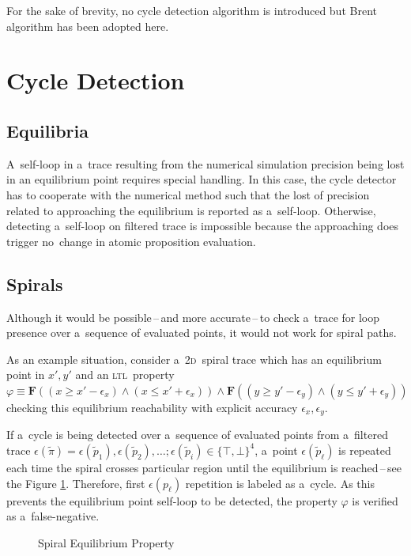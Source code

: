 \documentclass[12pt,twoside,draft]{fithesis}
\newcommand{\ltl}{\textsc{ltl}~}
\newcommand{\bF}{\mathbf{F}}
\begin{document}
For the sake of brevity, no cycle detection algorithm is introduced
but Brent algorithm\cite{wloop,brent} has been adopted here.

\section{Cycle Detection}
\subsection*{Equilibria}
A~self-loop in a~trace resulting from the numerical simulation precision
being lost in an equilibrium point requires special handling. In this
case, the cycle detector has to cooperate with the numerical method such
that the lost of precision related to approaching the equilibrium is
reported as a~self-loop. Otherwise, detecting a~self-loop on filtered
trace is impossible because the approaching does trigger no~change in
atomic proposition evaluation.

\subsection*{Spirals}
Although it would be possible\,--\,and more accurate\,--\,to check
a~trace for loop presence over a~sequence of evaluated points,
it would not work for spiral paths.

As an example situation, consider
a~\textsc{2d}~spiral trace which has an equilibrium point in $x',y'$
and an \ltl property
$\varphi\equiv\bF((x\ge x'-\epsilon_x)\wedge(x\le x'+\epsilon_x))\wedge
\bF((y\ge y'-\epsilon_y)\wedge(y\le y'+\epsilon_y))$ checking this
equilibrium reachability with explicit accuracy
$\epsilon_x,\epsilon_y$.

If a~cycle is being detected over a~sequence of evaluated points
from a~filtered trace
$\epsilon(\tilde{\pi})=\epsilon(\tilde{p}_1),\epsilon(\tilde{p}_2),
\dotsc; \epsilon(\tilde{p}_i)\in\{\top,\bot\}^4$, a~point
$\epsilon(\tilde{p}_{\ell})$ is repeated each time the spiral crosses
particular region until the equilibrium is reached\,--\,see the Figure
\ref{spiral}. Therefore, first $\epsilon(p_{\ell})$ repetition is
labeled as a~cycle. As this prevents the equilibrium point self-loop to
be detected, the property $\varphi$ is verified as a~false-negative.
\begin{figure}
\center

\caption{Spiral Equilibrium Property}
\label{spiral}
\end{figure}
\end{document}
